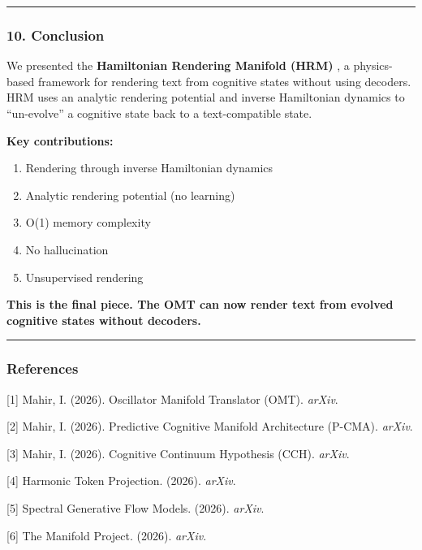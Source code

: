 \documentclass[
  11pt,
  a4paper,
]{article}
\providecommand{\tightlist}{%
  \setlength{\itemsep}{0pt}\setlength{\parskip}{0pt}}
\begin{document}
\begin{center}\rule{0.5\linewidth}{0.5pt}\end{center}

\subsubsection{10. Conclusion}\label{conclusion-5}

We presented the \textbf{Hamiltonian Rendering Manifold (HRM)} , a
physics-based framework for rendering text from cognitive states without
using decoders. HRM uses an analytic rendering potential and inverse
Hamiltonian dynamics to ``un-evolve'' a cognitive state back to a
text-compatible state.

\textbf{Key contributions:}

\begin{enumerate}
\def\labelenumi{\arabic{enumi}.}
\tightlist
\item
  Rendering through inverse Hamiltonian dynamics
\item
  Analytic rendering potential (no learning)
\item
  O(1) memory complexity
\item
  No hallucination
\item
  Unsupervised rendering
\end{enumerate}

\textbf{This is the final piece. The OMT can now render text from
evolved cognitive states without decoders.}

\begin{center}\rule{0.5\linewidth}{0.5pt}\end{center}

\subsubsection{References}\label{references-5}

{[}1{]} Mahir, I. (2026). Oscillator Manifold Translator (OMT).
\emph{arXiv}.

{[}2{]} Mahir, I. (2026). Predictive Cognitive Manifold Architecture
(P-CMA). \emph{arXiv}.

{[}3{]} Mahir, I. (2026). Cognitive Continuum Hypothesis (CCH).
\emph{arXiv}.

{[}4{]} Harmonic Token Projection. (2026). \emph{arXiv}.

{[}5{]} Spectral Generative Flow Models. (2026). \emph{arXiv}.

{[}6{]} The Manifold Project. (2026). \emph{arXiv}.
\end{document}
